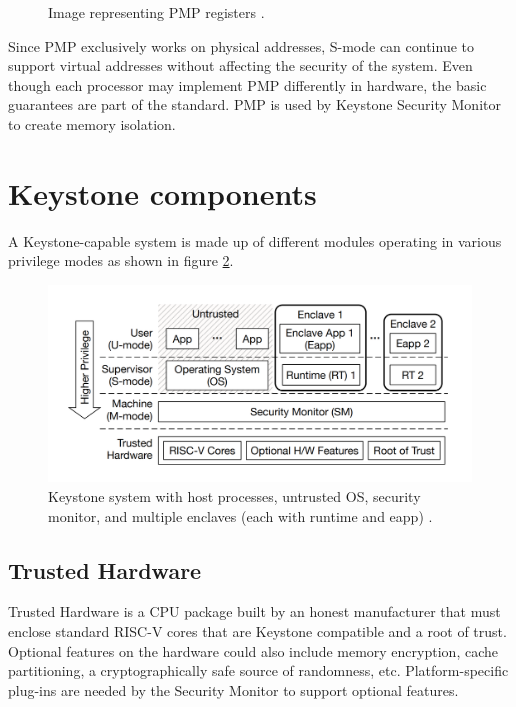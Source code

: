 \begin{figure}[h!]
    \centering
    
    \caption{Image representing PMP registers \cite{keystone-doc}.}
    \label{pmp-img}
\end{figure}

Since PMP exclusively works on physical addresses, S-mode can continue to support virtual addresses without affecting the security of the system. Even though each processor may implement PMP differently in hardware, the basic guarantees are part of the standard. PMP is used by Keystone Security Monitor to create memory isolation.


\section{Keystone components}
\label{keystone-components}
A Keystone-capable system is made up of different modules operating in various privilege modes as shown in figure \ref{keystoneComponents}.

\begin{figure}[h!]
    \centering
    \includegraphics[scale=0.35]{./chapters/images/keystone-components.png}
    \caption{Keystone system with host processes, untrusted OS, security monitor, and multiple enclaves (each with runtime and eapp) \cite{lee2020keystone}.}
    \label{keystoneComponents}
\end{figure}
\subsection*{Trusted Hardware}
Trusted Hardware is a CPU package built by an honest manufacturer that must enclose standard RISC-V cores that are Keystone compatible and a root of trust. Optional features on the hardware could also include memory encryption, cache partitioning, a cryptographically safe source of randomness, etc. Platform-specific plug-ins are needed by the Security Monitor to support optional features.
